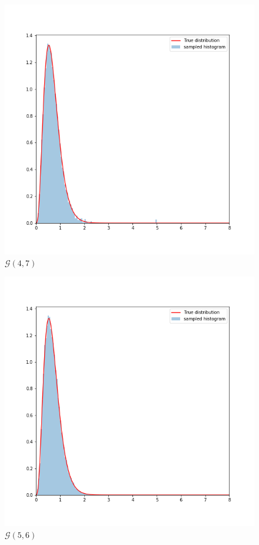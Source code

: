 \documentclass{article}
\begin{document}
\begin{figure}[h!]
\centering
\includegraphics[scale=0.3]{h4p3b13.png}
\caption{ $\mathcal{G}(4,7)$}
\end{figure}

\begin{figure}[h!]
\centering
\includegraphics[scale=0.3]{h4p3b23.png}
\caption{ $\mathcal{G}(5,6)$}
\end{figure}
\end{document}
